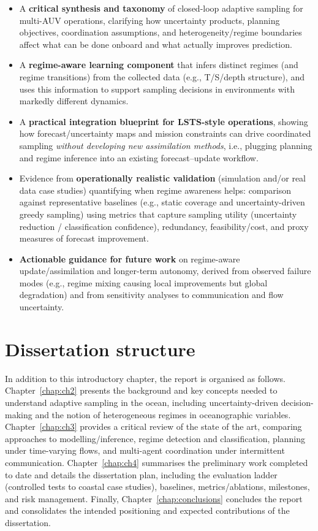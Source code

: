 \begin{itemize}
  \item A \textbf{critical synthesis and taxonomy} of closed-loop adaptive sampling for multi-AUV operations, clarifying how uncertainty products, planning objectives, coordination assumptions, and heterogeneity/regime boundaries affect what can be done onboard and what actually improves prediction.
  
  \item A \textbf{regime-aware learning component} that infers distinct regimes (and regime transitions) from the collected data (e.g., T/S/depth structure), and uses this information to support sampling decisions in environments with markedly different dynamics.
  
  \item A \textbf{practical integration blueprint for LSTS-style operations}, showing how forecast/uncertainty maps and mission constraints can drive coordinated sampling \emph{without developing new assimilation methods}, i.e., plugging planning and regime inference into an existing forecast--update workflow.
  
  \item Evidence from \textbf{operationally realistic validation} (simulation and/or real data case studies) quantifying when regime awareness helps: comparison against representative baselines (e.g., static coverage and uncertainty-driven greedy sampling) using metrics that capture sampling utility (uncertainty reduction / classification confidence), redundancy, feasibility/cost, and proxy measures of forecast improvement.
  
  \item \textbf{Actionable guidance for future work} on regime-aware update/assimilation and longer-term autonomy, derived from observed failure modes (e.g., regime mixing causing local improvements but global degradation) and from sensitivity analyses to communication and flow uncertainty.
\end{itemize}


\section{Dissertation structure} \label{sec:struct}

In addition to this introductory chapter, the report is organised as follows.
Chapter~\ref{chap:ch2} presents the background and key concepts needed to understand adaptive sampling in the ocean, including uncertainty-driven decision-making and the notion of heterogeneous regimes in oceanographic variables.
Chapter~\ref{chap:ch3} provides a critical review of the state of the art, comparing approaches to modelling/inference, regime detection and classification, planning under time-varying flows, and multi-agent coordination under intermittent communication.
Chapter~\ref{chap:ch4} summarises the preliminary work completed to date and details the dissertation plan, including the evaluation ladder (controlled tests to coastal case studies), baselines, metrics/ablations, milestones, and risk management.
Finally, Chapter~\ref{chap:conclusions} concludes the report and consolidates the intended positioning and expected contributions of the dissertation.



